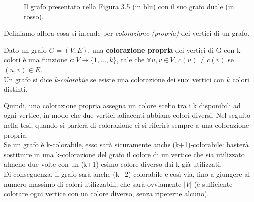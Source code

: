 \documentclass[a4paper,12pt,titlepage]{report}
\begin{document}
	\clearpage
	\begin{figure}[h!]
		\centering
		\vspace{-1cm}
		\caption{Il grafo presentato nella Figura 3.5 (in blu) con il suo grafo duale (in rosso).}
	\end{figure}
	
	Definiamo allora cosa si intende per \emph{colorazione (propria)} dei vertici di un grafo.
	\begin{dfn}
		Dato un grafo $G=(V,E)$, una {\bfseries colorazione propria} dei vertici di G con k colori è una funzione $c \colon V \to \{1,\dots,k\}$, tale che $\forall u, v \in V$, $c(u) \ne c(v)$ se $(u,v) \in E$. 
		\\Un grafo si dice \emph{k-colorabile} se esiste una colorazione dei suoi vertici con $k$ colori distinti.
	\end{dfn}
	\noindent Quindi, una colorazione propria assegna un colore scelto tra i k disponibili ad ogni vertice, in modo che due vertici adiacenti abbiano colori diversi. Nel seguito nella tesi, quando si parlerà di colorazione ci si riferirà sempre a una colorazione propria.
	\\Se un grafo è k-colorabile, esso sarà sicuramente anche (k+1)-colorabile: basterà sostituire in una k-colorazione del grafo il colore di un vertice che sia utilizzato almeno due volte con un (k+1)-esimo colore diverso dai k già utilizzati.
	\\Di conseguenza, il grafo sarà anche (k+2)-colorabile e così via, fino a giungere al numero massimo di colori utilizzabili, che sarà ovviamente $\lvert V \rvert$ (è sufficiente colorare ogni vertice con un colore diverso, senza ripeterne alcuno).
	\vspace{0.5cm}
	
\end{document}
